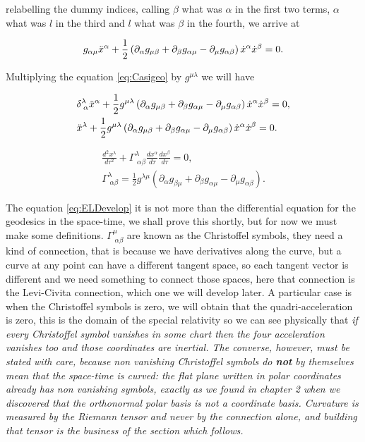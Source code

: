         relabelling the dummy indices, calling $\beta$ what was $\alpha$ in the first two terms, $\alpha$ what was $l$ in the third and $l$ what was $\beta$ in the fourth, we arrive at

        \begin{equation}\label{eq:Casigeo}
            g_{\alpha\mu}\Ddot{x}^{\alpha} + \frac{1}{2}\left(\partial_{\alpha}g_{\mu\beta} + \partial_{\beta}g_{\alpha\mu} - \partial_{\mu}g_{\alpha\beta} \right)\Dot{x}^{\alpha}\Dot{x}^{\beta} = 0.
        \end{equation}

        Multiplying the equation \ref{eq:Casigeo} by $g^{\mu\lambda}$ we will have

        \begin{align}
            &\delta^{\lambda}_{\;\alpha}\Ddot{x}^{\alpha} + \frac{1}{2}g^{\mu\lambda}\left(\partial_{\alpha}g_{\mu\beta} + \partial_{\beta}g_{\alpha\mu} - \partial_{\mu}g_{\alpha\beta} \right)\Dot{x}^{\alpha}\Dot{x}^{\beta} = 0,\\
            &\Ddot{x}^{\lambda} + \frac{1}{2}g^{\mu\lambda}\left(\partial_{\alpha}g_{\mu\beta} + \partial_{\beta}g_{\alpha\mu} - \partial_{\mu}g_{\alpha\beta} \right)\Dot{x}^{\alpha}\Dot{x}^{\beta} = 0.
        \end{align}

        \begin{align}\label{eq:ELDevelop}
            \frac{d^2x^{\lambda}}{d\tau^2} + \Gamma^{\lambda}_{\;\alpha\beta}\frac{dx^{\alpha}}{d\tau}\frac{dx^{\beta}}{d\tau} = 0,\\
            \Gamma^{\lambda}_{\;\alpha\beta}=\frac{1}{2}g^{\lambda\mu}\left(\partial_{\alpha}g_{\beta\mu}+\partial_{\beta}g_{\alpha\mu}-\partial_{\mu}g_{\alpha\beta}\right).
        \end{align}

        The equation \ref{eq:ELDevelop} it is not more than the differential equation for the geodesics in the space-time, we shall prove this shortly, but for now we must make some definitions. $\Gamma^{\mu}_{\;\alpha\beta}$ are known as the Christoffel symbols, they need a kind of connection, that is because we have derivatives along the curve, but a curve at any point can have a different tangent space, so each tangent vector is different and we need something to connect those spaces, here that connection is the Levi-Civita connection, which one we will develop later. A particular case is when the Christoffel symbols is zero, we will obtain that the quadri-acceleration is zero, this is the domain of the special relativity so we can see physically that \textit{if every Christoffel symbol vanishes in some chart then the four acceleration vanishes too and those coordinates are inertial. The converse, however, must be stated with care, because non vanishing Christoffel symbols do \textbf{not} by themselves mean that the space-time is curved: the flat plane written in polar coordinates already has non vanishing symbols, exactly as we found in chapter 2 when we discovered that the orthonormal polar basis is not a coordinate basis. Curvature is measured by the Riemann tensor and never by the connection alone, and building that tensor is the business of the section which follows.}

